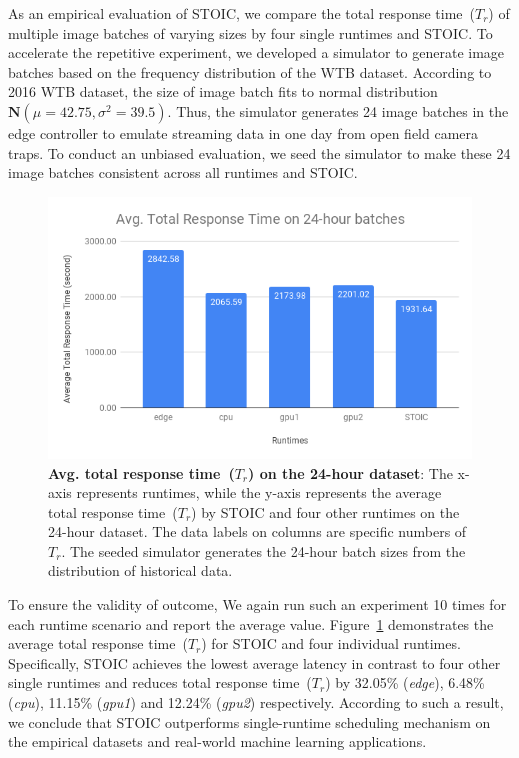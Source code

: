 %     


As an empirical evaluation of STOIC, we compare the total response time~($T_r$) of multiple image batches of varying sizes by four single runtimes and STOIC. To accelerate the repetitive experiment, we developed a simulator to generate image batches based on the frequency distribution of the WTB dataset. According to 2016 WTB dataset, the size of image batch fits to normal distribution $\mathbf{N}(\mu = 42.75, \sigma^2 = 39.5)$. Thus, the simulator generates 24 image batches in the edge controller to emulate streaming data in one day from open field camera traps. To conduct an unbiased evaluation, we seed the simulator to make these 24 image batches consistent across all runtimes and STOIC. 

\begin{figure}[t] \centering 
\includegraphics[scale=0.42]{figures/24-batches}
\caption{\textbf{Avg. total response time~($T_r$) on the 24-hour dataset}: The x-axis represents runtimes, while the y-axis represents the average total response time~($T_r$) by STOIC and four other runtimes on the 24-hour dataset. The data labels on columns are specific numbers of $T_r$. The seeded simulator generates the 24-hour batch sizes from the distribution of historical data. 
\label{fig:24-batch}}
\end{figure}

To ensure the validity of outcome, We again run such an experiment 10 times for each runtime scenario and report the average value. Figure~\ref{fig:24-batch} demonstrates the average total response time~($T_r$) for STOIC and four individual runtimes. Specifically, STOIC achieves the lowest average latency in contrast to four other single runtimes and reduces total response time~($T_r$) by 32.05\% (\textit{edge}), 6.48\% (\textit{cpu}), 11.15\% (\textit{gpu1}) and 12.24\% (\textit{gpu2}) respectively. According to such a result, we conclude that STOIC outperforms single-runtime scheduling mechanism on the empirical datasets and real-world machine learning applications.
